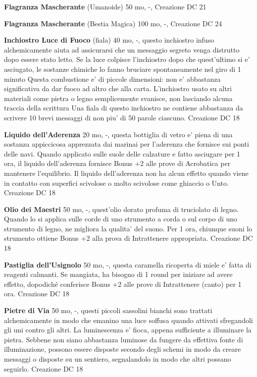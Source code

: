 \documentclass[a4paper,11pt,twoside,openany]{book}
\begin{document}
{		\textbf{Flagranza Mascherante} (Umanoide) 50 mo, -, Creazione DC 21
		
		\textbf{Flagranza Mascherante} (Bestia Magica) 100 mo, -, Creazione DC 24
		
		\textbf{Inchiostro Luce di Fuoco} (fiala) 40 mo, -, questo inchiostro infuso alchemicamente aiuta ad assicurarsi che un messaggio segreto venga distrutto dopo essere stato letto. Se la luce colpisce l'inchiostro dopo che quest'ultimo si e' asciugato, le sostanze chimiche lo fanno bruciare spontaneamente nel giro di 1 minuto
		Questa combustione e' di piccole dimensioni: non e' abbastanza significativa da dar fuoco ad altro che alla carta. L'inchiostro usato su altri materiali come pietra o legno semplicemente svanisce, non lasciando alcuna traccia della scrittura
		Una fiala di questo inchiostro ne contiene abbastanza da scrivere 10 brevi messaggi di non piu' di 50 parole ciascuno. Creazione DC 18
		
		\textbf{Liquido dell'Aderenza} 20 mo, -, questa bottiglia di vetro e' piena di una sostanza appiccicosa apprezzata dai marinai per l'aderenza che fornisce sui ponti delle navi. Quando applicato sulle suole delle calzature e fatto asciugare per 1 ora, il liquido dell'aderenza fornisce Bonus +2 alle prove di Acrobatica per mantenere l'equilibrio.
		Il liquido dell'aderenza non ha alcun effetto quando viene in contatto con superfici scivolose o molto scivolose come ghiaccio o Unto. Creazione DC 18
		
		\textbf{Olio dei Maestri} 50 mo, -, quest'olio dorato profuma di truciolato di legno. Quando lo si applica sulle corde di uno strumento a corda o sul corpo di uno strumento di legno, ne migliora la qualita' del suono. Per 1 ora, chiunque suoni lo strumento ottiene Bonus +2 alla prova di Intrattenere appropriata. Creazione DC 18
		
		\textbf{Pastiglia dell'Usignolo} 50 mo, -, questa caramella ricoperta di miele e' fatta di reagenti calmanti. Se mangiata, ha bisogno di 1 round per iniziare ad avere effetto, dopodiché conferisce Bonus +2 alle prove di Intrattenere (canto) per 1 ora. Creazione DC 18
		
		\textbf{Pietre di Via} 50 mo, -, questi piccoli sassolini bianchi sono trattati alchemicamente in modo che emanino una luce soffusa quando attivati sfregandoli gli uni contro gli altri. La luminescenza e' fioca, appena sufficiente a illuminare la pietra.
		Sebbene non siano abbastanza luminose da fungere da effettiva fonte di illuminazione, possono essere disposte secondo degli schemi in modo da creare messaggi o disposte su un sentiero, segnalandolo in modo che altri possano seguirlo. Creazione DC 18
		
}
\end{document}
